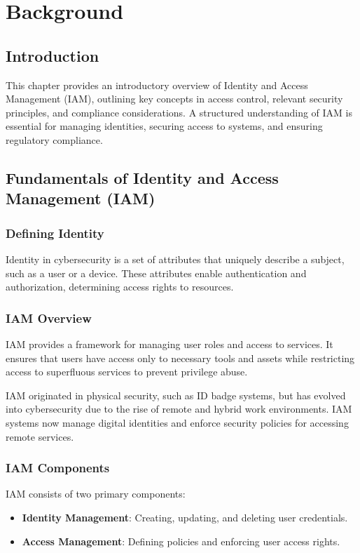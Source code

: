 
\chapter{Background}\label{ch:bg}

\section{Introduction}
This chapter provides an introductory overview of Identity and Access Management (IAM), outlining key concepts in access control, relevant security principles, and compliance considerations. A structured understanding of IAM is essential for managing identities, securing access to systems, and ensuring regulatory compliance.

\section{Fundamentals of Identity and Access Management (IAM)}

\subsection{Defining Identity}
Identity in cybersecurity is a set of attributes that uniquely describe a subject, such as a user or a device. These attributes enable authentication and authorization, determining access rights to resources\citep{Gartner-DefIAM}.

\subsection{IAM Overview}
IAM provides a framework for managing user roles and access to services\citep{Gartner-DefIAM}. It ensures that users have access only to necessary tools and assets while restricting access to superfluous services to prevent privilege abuse.

IAM originated in physical security, such as ID badge systems, but has evolved into cybersecurity due to the rise of remote and hybrid work environments\citep{StrongDM-IAM}. IAM systems now manage digital identities and enforce security policies for accessing remote services.

\subsection{IAM Components}
IAM consists of two primary components:
\begin{itemize}
	\item \textbf{Identity Management}: Creating, updating, and deleting user credentials.
	\item \textbf{Access Management}: Defining policies and enforcing user access rights.
\end{itemize}

